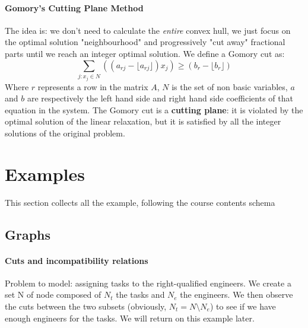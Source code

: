 \documentclass{article}
\begin{document}
				\paragraph{Gomory's Cutting Plane Method}
					The idea is: we don't need to calculate the \textit{entire} convex hull, we just focus on the optimal solution "neighbourhood" and progressively "cut away" fractional parts until we reach an integer optimal solution. We define a Gomory cut as:
					\begin{equation}
						\sum_{j:x_j \in N} ((a_{rj} - \lfloor a_{rj} \rfloor) x_j) \geq (b_r - \lfloor b_r \rfloor) 
					\end{equation}
					Where $r$ represents a row in the matrix $A$, $N$ is the set of non basic variables, $a$ and $b$ are respectively the left hand side and right hand side coefficients of that equation in the system. The Gomory cut is a \textbf{cutting plane}: it is violated by the optimal solution of the linear relaxation, but it is satisfied by all the integer solutions of the original problem.

			


	\clearpage
	\section{Examples}
		This section collects all the example, following the course contents schema
		
		\subsection{Graphs}
			\paragraph{Cuts and incompatibility relations}
				Problem to model: assigning tasks to the right-qualified engineers. We create a set N of node composed of $N_t$ the tasks and $N_e$ the engineers. We then observe the cuts between the two subsets (obviously, $N_t = N \setminus N_e$) to see if we have enough engineers for the tasks. We will return on this example later.
\end{document}
